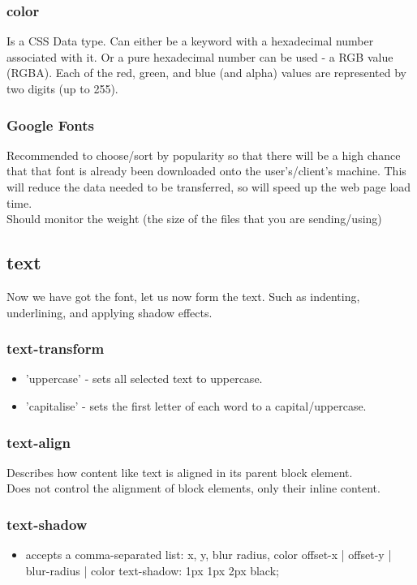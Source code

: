 \documentclass[]{article}
\begin{document}
\subsubsection{color}
Is a CSS Data type. Can either be a keyword with a hexadecimal number associated with it.  Or a pure hexadecimal number can be used - a RGB value (RGBA).  Each of the red, green, and blue (and alpha) values are represented by two digits (up to 255).

\subsubsection{Google Fonts}
Recommended to choose/sort by popularity so that there will be a high chance that that font is already been downloaded onto the user's/client's machine.  This will reduce the data needed to be transferred, so will speed up the web page load time.
\\
Should monitor the weight (the size of the files that you are sending/using)

\subsection{text} 
Now we have got the font, let us now form the text.  Such as indenting, underlining, and applying shadow effects.

\subsubsection{text-transform}
\begin{itemize}
	\item 'uppercase' - sets all selected text to uppercase.
	\item 'capitalise' - sets the first letter of each word to a capital/uppercase.
\end{itemize}

\subsubsection{text-align}
Describes how  content like text is aligned in its parent block element.
\\
Does not control the alignment of block elements, only their inline content.

\subsubsection{text-shadow}
\begin{itemize}
	\item accepts a comma-separated list: x, y, blur radius, color 
	\subitem offset-x | offset-y | blur-radius | color
	\subitem text-shadow: 1px 1px 2px black;
	
\end{itemize}
\end{document}
